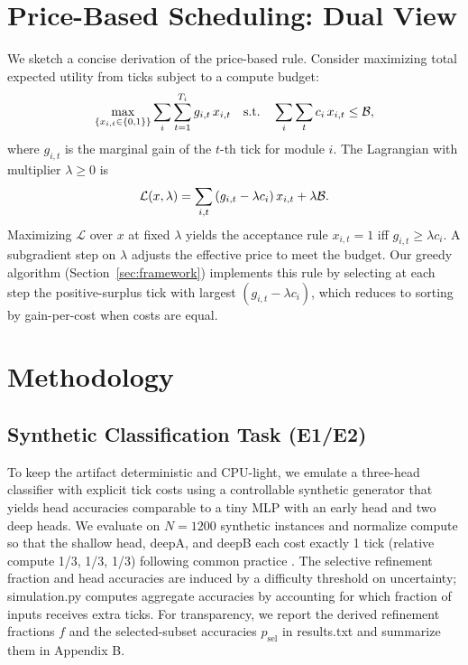 \section{Price-Based Scheduling: Dual View}
\label{sec:dual}
We sketch a concise derivation of the price-based rule. Consider maximizing total expected utility from ticks subject to a compute budget:
\begin{equation*}
\max_{\{x_{i,t}\in\{0,1\}\}} \sum_{i} \sum_{t=1}^{T_i} g_{i,t} \, x_{i,t}
\quad\text{s.t.}\quad \sum_{i} \sum_{t} c_i \, x_{i,t} \le \mathcal{B},
\end{equation*}
where $g_{i,t}$ is the marginal gain of the $t$-th tick for module $i$. The Lagrangian with multiplier $\lambda \ge 0$ is
\begin{equation*}
\mathcal{L}(x,\lambda) = \sum_{i,t} \left(g_{i,t} - \lambda c_i\right) x_{i,t} + \lambda \mathcal{B}.
\end{equation*}
Maximizing $\mathcal{L}$ over $x$ at fixed $\lambda$ yields the acceptance rule $x_{i,t}=1$ iff $g_{i,t} \ge \lambda c_i$. A subgradient step on $\lambda$ adjusts the effective price to meet the budget. Our greedy algorithm (Section~\ref{sec:framework}) implements this rule by selecting at each step the positive-surplus tick with largest $(g_{i,t}-\lambda c_i)$, which reduces to sorting by gain-per-cost when costs are equal.

\section{Methodology}
\label{sec:method}
\subsection{Synthetic Classification Task (E1/E2)}
To keep the artifact deterministic and CPU-light, we emulate a three-head classifier with explicit tick costs using a controllable synthetic generator that yields head accuracies comparable to a tiny MLP with an early head and two deep heads. We evaluate on $N=1200$ synthetic instances and normalize compute so that the shallow head, deepA, and deepB each cost exactly 1 tick (relative compute 1/3, 1/3, 1/3) following common practice \cite{Huang2018MSDNet,Wang2018SkipNet}. The selective refinement fraction and head accuracies are induced by a difficulty threshold on uncertainty; simulation.py computes aggregate accuracies by accounting for which fraction of inputs receives extra ticks. For transparency, we report the derived refinement fractions $f$ and the selected-subset accuracies $p_{\mathrm{sel}}$ in results.txt and summarize them in Appendix B.


